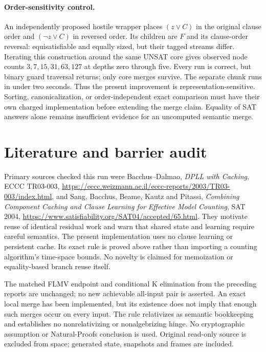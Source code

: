 \documentclass[11pt]{article}
\begin{document}
\paragraph{Order-sensitivity control.}
An independently proposed hostile wrapper places $(z\vee C)$ in the original
clause order and $(\neg z\vee C)$ in reversed order. Its children are $F$ and
its clause-order reversal: equisatisfiable and equally sized, but their tagged
streams differ. Iterating this construction around the same UNSAT core gives
observed node counts $3,7,15,31,63,127$ at depths zero through five. Every run
is correct, but binary guard traversal returns; only core merges survive.
The separate chunk runs in under two seconds. Thus the present improvement
is representation-sensitive. Sorting, canonicalization, or order-independent
exact comparison must have their own charged implementation before extending
the merge claim. Equality of SAT answers alone remains insufficient evidence
for an uncomputed semantic merge.

\section{Literature and barrier audit}
Primary sources checked this run were Bacchus--Dalmao,
\emph{DPLL with Caching}, ECCC TR03-003,
\url{https://eccc.weizmann.ac.il/eccc-reports/2003/TR03-003/index.html},
and Sang, Bacchus, Beame, Kautz and Pitassi,
\emph{Combining Component Caching and Clause Learning for Effective Model
Counting}, SAT 2004,
\url{https://www.satisfiability.org/SAT04/accepted/65.html}.
They motivate reuse of identical residual work and warn that shared state
and learning require careful semantics. The present implementation uses no
clause learning or persistent cache. Its exact rule is proved above rather
than importing a counting algorithm's time-space bounds. No novelty is
claimed for memoization or equality-based branch reuse itself.

The matched FLMV endpoint and conditional K elimination from the preceding
reports are unchanged; no new achievable all-input pair is asserted. An exact
local merge has been implemented, but its existence does not imply that enough
such merges occur on every input. The rule relativizes as semantic bookkeeping
and establishes no nonrelativizing or nonalgebrizing hinge. No cryptographic
assumption or Natural-Proofs conclusion is used. Original read-only source is
excluded from space; generated state, snapshots and frames are included.
\end{document}
